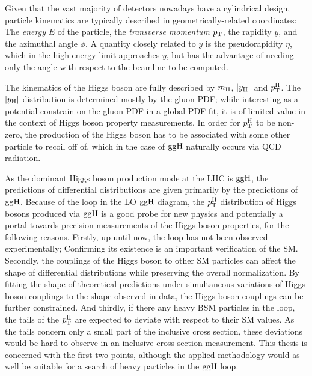 Given that the vast majority of detectors nowadays have a cylindrical design, particle kinematics are typically described in geometrically-related coordinates: The \textit{energy} $E$ of the particle, the \textit{transverse momentum} $p_\mathrm{T}$, the rapidity $y$, and the azimuthal angle $\phi$.
% 
A quantity closely related to $y$ is the pseudorapidity $\eta$, which in the high energy limit approaches $y$, but has the advantage of needing only the angle with respect to the beamline to be computed.



The kinematics of the Higgs boson are fully described by $m_{\mathrm{H}}$, $\left|y_\mathrm{H}\right| $ and $p_\mathrm{T}^\mathrm{H}$.
% 
The $\left|y_\mathrm{H}\right| $ distribution is determined mostly by the gluon PDF; while interesting as a potential constrain on the gluon PDF in a global PDF fit, it is of limited value in the context of Higgs boson property measurements.
% 
In order for $p_\mathrm{T}^\mathrm{H}$ to be non-zero, the production of the Higgs boson has to be associated with some other particle to recoil off of, which in the case of $\mathrm{g}\mathrm{g}\mathrm{H}$ naturally occurs via QCD radiation.





As the dominant Higgs boson production mode at the LHC is $\mathrm{g}\mathrm{g}\mathrm{H}$, the predictions of differential distributions are given primarily by the predictions of $\mathrm{g}\mathrm{g}\mathrm{H}$.
% 
Because of the loop in the LO $\mathrm{g}\mathrm{g}\mathrm{H}$ diagram, the $p_\mathrm{T}^\mathrm{H}$ distribution of Higgs bosons produced via $\mathrm{g}\mathrm{g}\mathrm{H}$ is a good probe for new physics and potentially a portal towards precision measurements of the Higgs boson properties, for the following reasons.
% 
Firstly, up until now, the loop has not been observed experimentally; Confirming its existence is an important verification of the SM.
% 
Secondly, the couplings of the Higgs boson to other SM particles can affect the shape of differential distributions while preserving the overall normalization.
% 
By fitting the shape of theoretical predictions under simultaneous variations of Higgs boson couplings to the shape observed in data, the Higgs boson couplings can be further constrained.
% 
And thirdly, if there any heavy BSM particles in the loop, the tails of the $p_\mathrm{T}^\mathrm{H}$ are expected to deviate with respect to their SM values.
% 
As the tails concern only a small part of the inclusive cross section, these deviations would be hard to observe in an inclusive cross section measurement.
% 
This thesis is concerned with the first two points, although the applied methodology would as well be suitable for a search of heavy particles in the $\mathrm{g}\mathrm{g}\mathrm{H}$ loop.

